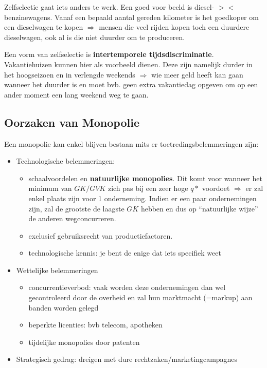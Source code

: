 Zelfselectie gaat iets anders te werk. Een goed voor beeld is diesel- $><$ benzinewagens. Vanaf een bepaald aantal gereden kilometer is het goedkoper om een dieselwagen te kopen $\Rightarrow$ mensen die veel rijden kopen toch een duurdere dieselwagen, ook al is die niet duurder om te produceren.

Een vorm van zelfselectie is \textbf{intertemporele tijdsdiscriminatie}. Vakantiehuizen kunnen hier als voorbeeld dienen. Deze zijn namelijk durder in het hoogseizoen en in verlengde weekends $\Rightarrow$ wie meer geld heeft kan gaan wanneer het duurder is en moet bvb. geen extra vakantiedag opgeven om op een ander moment een lang weekend weg te gaan.


\subsection{Oorzaken van Monopolie}
Een monopolie kan enkel blijven bestaan mits er toetredingsbelemmeringen zijn:
\begin{itemize}
   \item Technologische belemmeringen:
      \begin{itemize}
         \item schaalvoordelen en \textbf{natuurlijke monopolies}. Dit komt voor wanneer het minimum van $GK/GVK$ zich pas bij een zeer hoge $q*$ voordoet $\Rightarrow$ er zal enkel plaats zijn voor 1 onderneming. Indien er een paar ondernemingen zijn, zal de grootste de laagste $GK$ hebben en dus op ``natuurlijke wijze'' de anderen wegconcurreren.
         \item exclusief gebruiksrecht van productiefactoren.
         \item technologische kennis: je bent de enige dat iets specifiek weet
      \end{itemize}
   \item Wettelijke belemmeringen
      \begin{itemize}
         \item concurrentieverbod: vaak worden deze ondernemingen dan wel gecontroleerd door de overheid en zal hun marktmacht (=markup) aan banden worden gelegd
         \item beperkte licenties: bvb telecom, apotheken
         \item tijdelijke monopolies door patenten
      \end{itemize}
   \item Strategisch gedrag: dreigen met dure rechtzaken/marketingcampagnes
\end{itemize}
